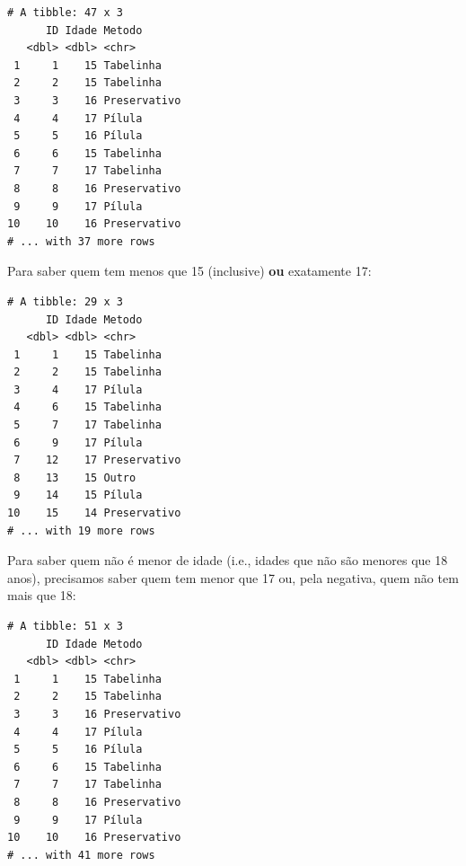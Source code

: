 \documentclass[
]{article}
\newenvironment{Shaded}{\begin{snugshade}}{\end{snugshade}}
\newcommand{\DecValTok}[1]{\textcolor[rgb]{0.00,0.00,0.81}{#1}}
\newcommand{\FunctionTok}[1]{\textcolor[rgb]{0.00,0.00,0.00}{#1}}
\newcommand{\NormalTok}[1]{#1}
\newcommand{\OtherTok}[1]{\textcolor[rgb]{0.56,0.35,0.01}{#1}}
\newcommand{\SpecialCharTok}[1]{\textcolor[rgb]{0.00,0.00,0.00}{#1}}
\begin{document}
\begin{verbatim}
# A tibble: 47 x 3
      ID Idade Metodo      
   <dbl> <dbl> <chr>       
 1     1    15 Tabelinha   
 2     2    15 Tabelinha   
 3     3    16 Preservativo
 4     4    17 Pílula      
 5     5    16 Pílula      
 6     6    15 Tabelinha   
 7     7    17 Tabelinha   
 8     8    16 Preservativo
 9     9    17 Pílula      
10    10    16 Preservativo
# ... with 37 more rows
\end{verbatim}

Para saber quem tem menos que 15 (inclusive) \textbf{ou} exatamente 17:

\begin{Shaded}
\end{Shaded}

\begin{verbatim}
# A tibble: 29 x 3
      ID Idade Metodo      
   <dbl> <dbl> <chr>       
 1     1    15 Tabelinha   
 2     2    15 Tabelinha   
 3     4    17 Pílula      
 4     6    15 Tabelinha   
 5     7    17 Tabelinha   
 6     9    17 Pílula      
 7    12    17 Preservativo
 8    13    15 Outro       
 9    14    15 Pílula      
10    15    14 Preservativo
# ... with 19 more rows
\end{verbatim}

Para saber quem não é menor de idade (i.e., idades que não são menores
que 18 anos), precisamos saber quem tem menor que 17 ou, pela negativa,
quem não tem mais que 18:

\begin{Shaded}
\end{Shaded}

\begin{verbatim}
# A tibble: 51 x 3
      ID Idade Metodo      
   <dbl> <dbl> <chr>       
 1     1    15 Tabelinha   
 2     2    15 Tabelinha   
 3     3    16 Preservativo
 4     4    17 Pílula      
 5     5    16 Pílula      
 6     6    15 Tabelinha   
 7     7    17 Tabelinha   
 8     8    16 Preservativo
 9     9    17 Pílula      
10    10    16 Preservativo
# ... with 41 more rows
\end{verbatim}
\end{document}
